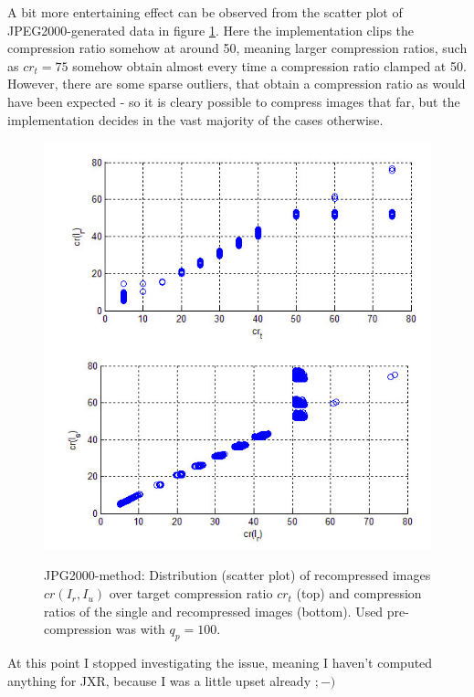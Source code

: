 \documentclass[10pt,twocolumn,letterpaper]{article}
\begin{document}
A bit more entertaining effect can be observed from the scatter plot of JPEG2000-generated data in figure \ref{fig:j2kStrange}. Here the implementation clips the compression ratio somehow at around 50, meaning larger compression ratios, such as $cr_t=75$ somehow obtain almost every time a compression ratio clamped at 50. However, there are some sparse outliers, that obtain a compression ratio as would have been expected - so it is cleary possible to compress images that far, but the implementation decides in the vast majority of the cases otherwise.

\begin{figure}
	\includegraphics[width=\linewidth]{img/j2k_plots.jpg}
	\label{fig:j2kStrange}
	\caption{JPG2000-method: Distribution (scatter plot) of recompressed images $cr(I_r, I_u)$ over target compression ratio $cr_t$ (top) and compression ratios of the single and recompressed images (bottom). Used pre-compression was with $q_p=100$. }
\end{figure}


At this point I stopped investigating the issue, meaning I haven't computed anything for JXR, because I was a little upset already $;-)$

{\small


}
\end{document}
